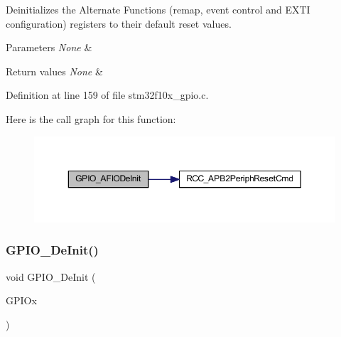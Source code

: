 Deinitializes the Alternate Functions (remap, event control and E\+X\+TI configuration) registers to their default reset values. 


\begin{DoxyParams}{Parameters}
{\em None} & \\
\hline
\end{DoxyParams}

\begin{DoxyRetVals}{Return values}
{\em None} & \\
\hline
\end{DoxyRetVals}


Definition at line 159 of file stm32f10x\+\_\+gpio.\+c.

Here is the call graph for this function\+:
\nopagebreak
\begin{figure}[H]
\begin{center}
\leavevmode
\includegraphics[width=350pt]{group___g_p_i_o___private___functions_ga7f645e6b6146818c3d6c19021e70170c_cgraph}
\end{center}
\end{figure}
\mbox{\label{group___g_p_i_o___private___functions_gaa60bdf3182c44b5fa818f237042f52ee}} 
\subsubsection{\texorpdfstring{G\+P\+I\+O\+\_\+\+De\+Init()}{GPIO\_DeInit()}}
{\footnotesize\ttfamily void G\+P\+I\+O\+\_\+\+De\+Init (\begin{DoxyParamCaption}\item[{\hyperlink{struct_g_p_i_o___type_def}{G\+P\+I\+O\+\_\+\+Type\+Def} $\ast$}]{G\+P\+I\+Ox }\end{DoxyParamCaption})}



